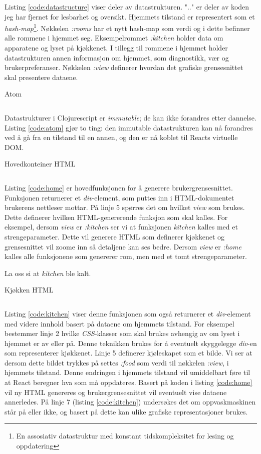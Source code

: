 Listing \ref{code:datastructure} viser deler av datastrukturen. ".." er deler av koden jeg har fjernet for lesbarhet og oversikt. Hjemmets tilstand er representert som et \emph{hash-map}\footnote{En assosiativ datastruktur med konstant tidskompleksitet for lesing og oppdatering}. Nøkkelen \emph{:rooms} har et nytt hash-map som verdi og i dette befinner alle rommene i hjemmet seg. Eksempelrommet \emph{:kitchen} holder data om apparatene og lyset på kjøkkenet. I tillegg til rommene i hjemmet holder datastrukturen annen informasjon om hjemmet, som diagnostikk, vær og brukerpreferanser. Nøkkelen \emph{:view} definerer hvordan det grafiske grensesnittet skal presentere dataene.  
\begin{listing}[ht]
\caption{Atom}
\inputminted[fontsize=\footnotesize, linenos]{clj}{kodesnutter/atom.clj}
\label{code:atom}
\end{listing}
Datastrukturer i Clojurescript er \emph{immutable}; de kan ikke forandres etter dannelse. Listing \ref{code:atom} gjør to ting: den immutable datastrukturen kan nå forandres ved å gå fra en tilstand til en annen, og den er nå koblet til Reacts virtuelle DOM.
\begin{listing}[ht]
\caption{Hovedkonteiner HTML}
\inputminted[fontsize=\footnotesize, linenos]{clj}{kodesnutter/home.clj}
\label{code:home}
\end{listing}
Listing \ref{code:home} er hovedfunksjonen for å generere brukergrensesnittet. Funksjonen returnerer et \emph{div}-element, som puttes inn i HTML-dokumentet brukerens nettleser mottar. På linje 5 spørres det om hvilket \emph{view} som brukes. Dette definerer hvilken HTML-genererende funksjon som skal kalles. For eksempel, dersom \emph{view} er \emph{:kitchen} ser vi at funksjonen \emph{kitchen} kalles med et strengeparameter. Dette vil generere HTML som definerer kjøkkenet og grensesnittet vil zoome inn så detaljene kan ses bedre. Dersom \emph{view} er \emph{:home} kalles alle funksjonene som genererer rom, men med et tomt strengeparameter.

La oss si at \emph{kitchen} ble kalt.\begin{listing}[ht]
\caption{Kjøkken HTML}
\inputminted[fontsize=\footnotesize, linenos]{clj}{kodesnutter/kitchen.clj}
\label{code:kitchen}
\end{listing} Listing \ref{code:kitchen} viser denne funksjonen som også returnerer et \emph{div}-element med videre innhold basert på dataene om hjemmets tilstand. For eksempel bestemmer linje 2 hvilke \emph{CSS}-klasser som skal brukes avhengig av om lyset i hjemmet er av eller på. Denne teknikken brukes for å eventuelt skyggelegge \emph{div}-en som representerer kjøkkenet. Linje 5 definerer kjøleskapet som et bilde. Vi ser at dersom dette bildet trykkes på settes \emph{:food} som verdi til nøkkelen \emph{:view}, i hjemmets tilstand. Denne endringen i hjemmets tilstand vil umiddelbart føre til at React beregner hva som må oppdateres. Basert på koden i listing \ref{code:home} vil ny HTML genereres og brukergrensesnittet vil eventuelt vise dataene annerledes. På linje 7 (listing \ref{code:kitchen}) undersøkes det om oppvaskmaskinen står på eller ikke, og basert på dette kan ulike grafiske representasjoner brukes.

